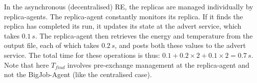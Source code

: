 \documentclass{rspublic}
\newcommand{\alnote}[1]{ {\textcolor{blue} { ***andre: #1 }}}
\newcommand{\athotanote}[1]{ {\textcolor{green} { ***athota: #1 }}}
\newcommand{\alnote}[1]{}
\newcommand{\athotanote}[1]{}
\begin{document}
In the asynchronous (decentralised) RE, the replicas are managed
individually by replica-agents. The replica-agent constantly monitors
its replica. If it finds the replica has completed its run, it updates
its state at the advert service, which takes $0.1\,s$.  The
replica-agent then retrieves the energy and temperature from the output
file, each of which takes $0.2\,s$, and posts both these values
to the advert service.  The total time for these operations is
thus: $0.1+0.2\times2+0.1\times2=0.7\,s$. 
Note that here $T_{find}$ involves pre-exchange management at 
the replica-agent and not the BigJob-Agent (like the centralised case).  




\end{document}
